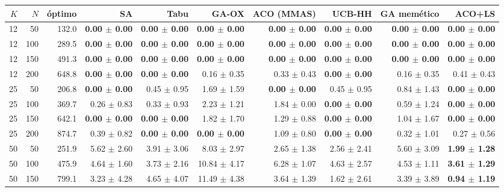 \begin{tabular}{rrrrrrrrrr}
\toprule
$K$ & $N$ & óptimo & SA & Tabu & GA-OX & ACO (MMAS) & UCB-HH & GA memético & ACO+LS \\
\midrule
12 & 50 & 132.0 & \textbf{0.00 $\pm$ 0.00} & \textbf{0.00 $\pm$ 0.00} & \textbf{0.00 $\pm$ 0.00} & \textbf{0.00 $\pm$ 0.00} & \textbf{0.00 $\pm$ 0.00} & \textbf{0.00 $\pm$ 0.00} & \textbf{0.00 $\pm$ 0.00} \\
12 & 100 & 289.5 & \textbf{0.00 $\pm$ 0.00} & \textbf{0.00 $\pm$ 0.00} & \textbf{0.00 $\pm$ 0.00} & \textbf{0.00 $\pm$ 0.00} & \textbf{0.00 $\pm$ 0.00} & \textbf{0.00 $\pm$ 0.00} & \textbf{0.00 $\pm$ 0.00} \\
12 & 150 & 491.3 & \textbf{0.00 $\pm$ 0.00} & \textbf{0.00 $\pm$ 0.00} & \textbf{0.00 $\pm$ 0.00} & \textbf{0.00 $\pm$ 0.00} & \textbf{0.00 $\pm$ 0.00} & \textbf{0.00 $\pm$ 0.00} & \textbf{0.00 $\pm$ 0.00} \\
12 & 200 & 648.8 & \textbf{0.00 $\pm$ 0.00} & \textbf{0.00 $\pm$ 0.00} & 0.16 $\pm$ 0.35 & 0.33 $\pm$ 0.43 & \textbf{0.00 $\pm$ 0.00} & 0.16 $\pm$ 0.35 & 0.41 $\pm$ 0.43 \\
25 & 50 & 206.8 & \textbf{0.00 $\pm$ 0.00} & 0.45 $\pm$ 0.95 & 1.69 $\pm$ 1.59 & \textbf{0.00 $\pm$ 0.00} & 0.45 $\pm$ 0.95 & 0.84 $\pm$ 1.43 & \textbf{0.00 $\pm$ 0.00} \\
25 & 100 & 369.7 & 0.26 $\pm$ 0.83 & 0.33 $\pm$ 0.93 & 2.23 $\pm$ 1.21 & 1.84 $\pm$ 0.00 & \textbf{0.00 $\pm$ 0.00} & 0.59 $\pm$ 1.24 & \textbf{0.00 $\pm$ 0.00} \\
25 & 150 & 642.1 & \textbf{0.00 $\pm$ 0.00} & \textbf{0.00 $\pm$ 0.00} & 1.82 $\pm$ 1.70 & 1.29 $\pm$ 0.88 & \textbf{0.00 $\pm$ 0.00} & 1.04 $\pm$ 1.67 & \textbf{0.00 $\pm$ 0.00} \\
25 & 200 & 874.7 & 0.39 $\pm$ 0.82 & \textbf{0.00 $\pm$ 0.00} & \textbf{0.00 $\pm$ 0.00} & 1.09 $\pm$ 0.80 & \textbf{0.00 $\pm$ 0.00} & 0.32 $\pm$ 1.01 & 0.27 $\pm$ 0.56 \\
50 & 50 & 251.9 & 5.62 $\pm$ 2.60 & 3.91 $\pm$ 3.06 & 8.03 $\pm$ 2.97 & 2.65 $\pm$ 1.38 & 2.56 $\pm$ 2.41 & 5.60 $\pm$ 3.09 & \textbf{1.99 $\pm$ 1.28} \\
50 & 100 & 475.9 & 4.64 $\pm$ 1.60 & 3.73 $\pm$ 2.16 & 10.84 $\pm$ 4.17 & 6.28 $\pm$ 1.07 & 4.63 $\pm$ 2.57 & 4.53 $\pm$ 1.11 & \textbf{3.61 $\pm$ 1.29} \\
50 & 150 & 799.1 & 3.23 $\pm$ 4.28 & 4.65 $\pm$ 4.07 & 11.49 $\pm$ 4.38 & 3.64 $\pm$ 1.39 & 1.62 $\pm$ 2.61 & 3.39 $\pm$ 3.89 & \textbf{0.94 $\pm$ 1.19} \\

\end{tabular}
